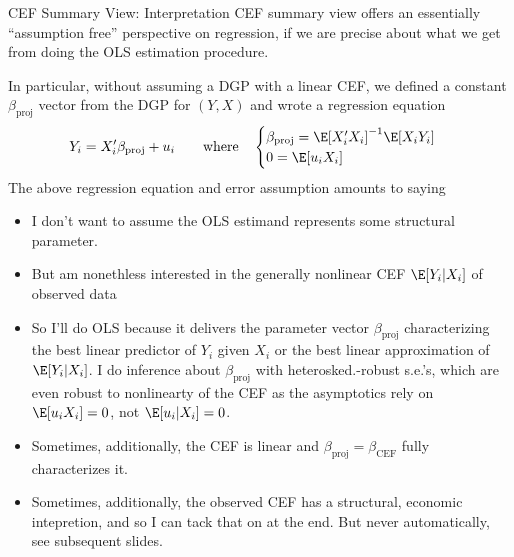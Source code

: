 \documentclass[aspectratio=169, handout]{beamer}
\begin{document}
{\scriptsize
\begin{frame}{CEF Summary View: Interpretation}
CEF summary view offers an essentially ``assumption free'' perspective
on regression, if we are precise about what we get from doing the OLS
estimation procedure.

In particular, \alert{without} assuming a DGP with a linear CEF,
we defined a constant $\beta_\text{proj}$ vector from the DGP for
$(Y,X)$ and wrote a regression equation
\begin{align*}
  Y_i =
  X_i'
  \beta_\text{proj}
  + u_i
  \qquad
  \text{where}
  \quad
  \begin{cases}
    \beta_\text{proj}
    = \E[X_i'X_i]^{-1}\E[X_iY_i]
    \\
    0 = \E[u_iX_i]
  \end{cases}
\end{align*}
The above regression equation and error assumption amounts to saying
\begin{itemize}
  \item I don't want to assume the OLS estimand
    represents some structural parameter.

  \item But am nonethless interested in the generally nonlinear CEF
    $\E[Y_i|X_i]$ of \alert{observed data}

  \item So I'll do OLS because it delivers the parameter vector
    $\beta_\text{proj}$ characterizing the
    \alert{best linear predictor} of $Y_i$ given $X_i$ or the
    \alert{best linear approximation} of $\E[Y_i|X_i]$.
    I do inference about $\beta_\text{proj}$ with
    heterosked.-robust s.e.'s, which are even robust to nonlinearty of
    the CEF as the asymptotics rely on $\E[u_i X_i]=0$, not
    $\E[u_i|X_i]=0$.

  \item Sometimes, \alert{additionally}, the CEF is \alert{linear} and
    $\beta_{\text{proj}}=\beta_{\text{CEF}}$ fully characterizes it.

  \item Sometimes, \alert{additionally}, the observed CEF has a
    structural, economic intepretion, and so I can tack that on at the
    end. But never automatically, see subsequent slides.
\end{itemize}
\end{frame}
}
\end{document}
